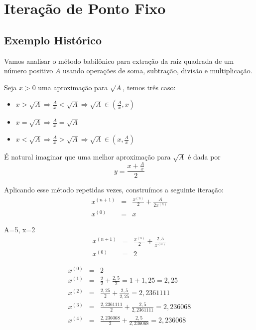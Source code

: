 \section{Iteração de Ponto Fixo}

\subsection{Exemplo Histórico}
Vamos analisar o método babilônico para extração da raiz quadrada de um número positivo $A$ usando operações de soma, subtração, divisão e multiplicação.

Seja $x>0$ uma aproximação para $\sqrt{A}$, temos três caso:
\begin{itemize}
\item $x>\sqrt{A} \Longrightarrow \frac{A}{x}<\sqrt{A} \Longrightarrow \sqrt{A}\in \left(\frac{A}{x},x\right)$
\item $x=\sqrt{A} \Longrightarrow \frac{A}{x}=\sqrt{A}$
\item $x<\sqrt{A} \Longrightarrow \frac{A}{x}>\sqrt{A} \Longrightarrow \sqrt{A}\in \left(x,\frac{A}{x}\right)$
\end{itemize}
É natural imaginar que uma melhor aproximação para $\sqrt{A}$ é dada por
$$y=\frac{x+\frac{A}{x}}{2}$$

Aplicando esse método repetidas vezes, construímos a seguinte iteração:
\begin{eqnarray*}
x^{(n+1)}&=&\frac{x^{(n)}}{2}+\frac{A}{2x^{(n)}}\\
x^{(0)}&=&x
\end{eqnarray*}

\begin{ex}
A=5, x=2
\begin{eqnarray*}
x^{(n+1)}&=&\frac{x^{(n)}}{2}+\frac{2,5}{x^{(n)}}\\
x^{(0)}&=&2
\end{eqnarray*}

\begin{eqnarray*}
x^{(0)}&=&2\\
x^{(1)}&=&\frac{2}{2}+\frac{2,5}{2}=1+1,25=2,25\\
x^{(2)}&=&\frac{2,25}{2}+\frac{2,5}{2,25}= 2,2361111  \\
x^{(3)}&=&\frac{2,2361111}{2}+\frac{2,5}{2,2361111}= 2,236068  \\
x^{(4)}&=&\frac{2,236068}{2}+\frac{2,5}{2,236068}= 2,236068
\end{eqnarray*}  
\end{ex}

